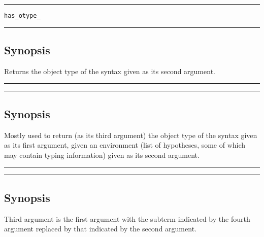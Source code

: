 \vspace{2mm}
\hrule
\vspace{2mm}
\begin{Large}
{\tt has\_otype\_}
\end{Large}
\vspace{2mm}
\hrule
\vspace{2mm}


\subsection*{Synopsis}
Returns the object type of the
syntax given as its second argument.  

\vspace{2mm}
\hrule
\vspace{2mm}
\begin{Large}
\end{Large}
\vspace{2mm}
\hrule
\vspace{2mm}


\subsection*{Synopsis}
Mostly used to return (as its third argument) the object type of the
syntax given as its first argument, given an environment (list of
hypotheses, some of which may contain typing information) given as its 
second argument.

\vspace{2mm}
\hrule
\vspace{2mm}
\begin{Large}
\end{Large}
\vspace{2mm}
\hrule
\vspace{2mm}


\subsection*{Synopsis}
Third argument is the first argument with the subterm indicated by the 
fourth argument replaced by that indicated by the second argument.

